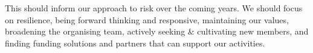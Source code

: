\documentclass[
]{book}
\begin{document}
This should inform our approach to risk over the coming years. We should focus on resilience, being forward thinking and responsive, maintaining our values, broadening the organising team, actively seeking \& cultivating new members, and finding funding solutions and partners that can support our activities.

  
\end{document}
